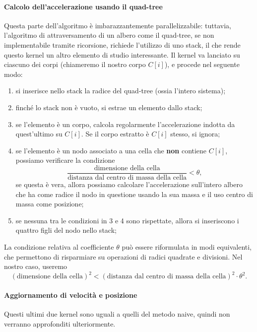 \documentclass{article}
\begin{document}
\paragraph{Calcolo dell'accelerazione usando il quad-tree}
Questa parte dell'algoritmo è imbarazzantemente parallelizzabile: tuttavia, l'algoritmo di attraversamento di un albero come il quad-tree, se non implementabile tramite ricorsione, richiede l'utilizzo di uno stack, il che rende questo kernel un altro elemento  di studio interessante.
Il kernel va lanciato su ciascuno dei corpi (chiameremo il nostro corpo $C[i]$), e procede nel seguente modo:
\begin{enumerate}
	\item si inserisce nello stack la radice del quad-tree (ossia l'intero sistema);
	\item finché lo stack non è vuoto, si estrae un elemento dallo stack;
	\item se l'elemento è un corpo, calcola regolarmente l'accelerazione indotta da quest'ultimo su $C[i]$. Se il corpo estratto è $C[i]$ stesso, si ignora;
	\item se l'elemento è un nodo associato a una cella che \textbf{non} contiene $C[i]$, possiamo verificare la condizione
	\begin{equation}
	\dfrac{\text{dimensione della cella}}{\text{distanza dal centro di massa della cella}} < \theta,
	\end{equation}
	se questa è vera, allora possiamo calcolare l'accelerazione sull'intero albero che ha come radice il nodo in questione usando la sua massa e il uso centro di massa come posizione;
	\item  se nessuna tra le condizioni in 3 e 4 sono rispettate, allora si inseriscono i quattro figli del nodo nello stack;
\end{enumerate}
La condizione relativa al coefficiente $\theta$ può essere riformulata in modi equivalenti, che permettono di risparmiare su operazioni di radici quadrate e divisioni. Nel nostro caso, useremo
\begin{equation}
	(\text{dimensione della cella})^2 < (\text{distanza dal centro di massa della cella})^2 \cdot \theta^2.
\end{equation} 


\paragraph{Aggiornamento di velocità e posizione}
Questi ultimi due kernel sono uguali a quelli del metodo naive, quindi non verranno approfonditi ulteriormente.
\end{document}
